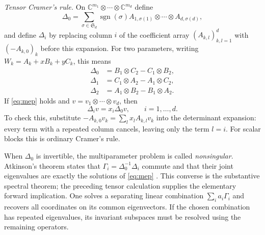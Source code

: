 \documentclass[12pt]{article}
\def\C{\mathbb{C}}
\theoremstyle{definition}
\theoremstyle{remark}
\begin{document}
\emph{Tensor Cramer's rule.} On $\C^{m_1}\otimes\cdots\otimes\C^{m_d}$ define
\[
  \Delta_0=\sum_{\sigma\in\mathfrak S_d}\operatorname{sgn}(\sigma)
      A_{1,\sigma(1)}\otimes\cdots\otimes A_{d,\sigma(d)},
\]
and define $\Delta_i$ by replacing column $i$ of the coefficient array
$(A_{k,l})_{k,l=1}^d$ with $(-A_{k,0})_k$ before this expansion.
For two parameters, writing $W_k=A_k+xB_k+yC_k$, this means
\begin{align*}
  \Delta_0&=B_1\otimes C_2-C_1\otimes B_2,\\
  \Delta_1&=C_1\otimes A_2-A_1\otimes C_2,\\
  \Delta_2&=A_1\otimes B_2-B_1\otimes A_2.
\end{align*}
If \eqref{eq:mep} holds and $v=v_1\otimes\cdots\otimes v_d$, then
\[
  \Delta_i v=x_i\Delta_0v,\qquad i=1,\ldots,d.
\]
To check this, substitute $-A_{k,0}v_k=\sum_lx_lA_{k,l}v_k$ into the determinant
expansion: every term with a repeated column cancels, leaving only the term $l=i$.
For scalar blocks this is ordinary Cramer's rule.

When $\Delta_0$ is invertible, the multiparameter problem is called \emph{nonsingular}.
Atkinson's theorem states that $\Gamma_i=\Delta_0^{-1}\Delta_i$ commute and that their
joint eigenvalues are exactly the solutions of \eqref{eq:mep}
\cite{atkinson1972multiparameter}. This converse is the substantive spectral theorem;
the preceding tensor calculation supplies the elementary forward implication.
One solves a separating linear combination $\sum_i a_i\Gamma_i$ and recovers all
coordinates on its common eigenvectors. If the chosen combination has repeated eigenvalues,
its invariant subspaces must be resolved using the remaining operators.
\end{document}
